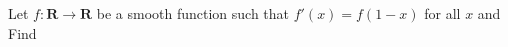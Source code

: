 Let $ f : \mathbf{R} \to \mathbf{R} $ be a smooth function such that $f'(x)=f(1-x)$ for all $x$ and  Find 